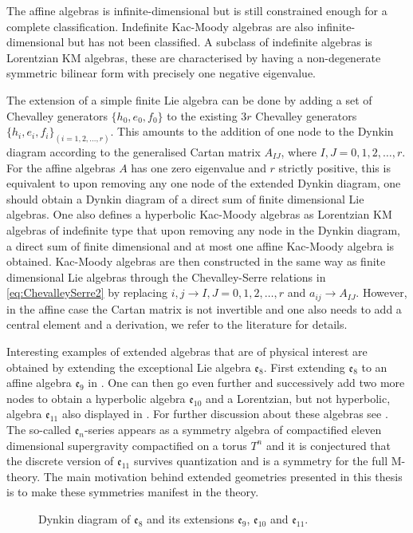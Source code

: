 The affine algebras is infinite-dimensional but is still constrained enough for a complete classification. Indefinite Kac-Moody algebras are also infinite-dimensional but has not been classified. A subclass of indefinite algebras is Lorentzian KM algebras, these are characterised by having a non-degenerate symmetric bilinear form with precisely one negative eigenvalue. 

The extension of a simple finite Lie algebra can be done by adding a set of Chevalley generators $\{h_0,e_0,f_0\}$ to the existing $3r$ Chevalley generators $\{h_i,e_i,f_i\}_{(i=1,2,\ldots,r)}$. This amounts to the addition of one node to the Dynkin diagram according to the generalised Cartan matrix $A_{IJ}$, where $I,J=0,1,2,\ldots, r$. For the affine algebras $A$ has one zero eigenvalue and $r$ strictly positive, this is equivalent to upon removing any one node of the extended Dynkin diagram, one should obtain a Dynkin diagram of a direct sum of finite dimensional Lie algebras. One also defines a hyperbolic Kac-Moody algebras as Lorentzian KM algebras of indefinite type that upon removing any node in the Dynkin diagram, a direct sum of finite dimensional and at most one affine Kac-Moody algebra is obtained. Kac-Moody algebras are then constructed in the same way as finite dimensional Lie algebras through the Chevalley-Serre relations in \eqref{eq:ChevalleySerre2} by replacing $i,j\to I,J=0,1,2,\ldots,r$ and $a_{ij}\to A_{IJ}$. However, in the affine case the Cartan matrix is not invertible and one also needs to add a central element and a derivation, we refer to the literature for details. 

Interesting examples of extended algebras that are of physical interest are obtained by extending the exceptional Lie algebra $\mathfrak{e}_8$. First extending $\mathfrak{e}_8$ to an affine algebra $\mathfrak{e}_9$ in . One can then go even further and successively add two more nodes to obtain a hyperbolic algebra $\mathfrak{e}_{10}$ and a Lorentzian, but not hyperbolic, algebra $\mathfrak{e}_{11}$ also displayed in . For further discussion about these algebras see \cite{PhdJakob2009,PhdDaniel2010}. The so-called $\mathfrak{e}_n$-series appears as a symmetry algebra of compactified eleven dimensional supergravity compactified on a torus $T^n$ and it is conjectured that the discrete version of $\mathfrak{e}_{11}$ survives quantization and is a symmetry for the full M-theory. The main motivation behind extended geometries presented in this thesis is to make these symmetries manifest in the theory. 
\begin{figure}
    \caption{Dynkin diagram of $\mathfrak{e}_8$ and its extensions $\mathfrak{e}_9$, $\mathfrak{e}_{10}$ and $\mathfrak{e}_{11}$.}
    \label{fig:DynkinEseries}
\end{figure}

